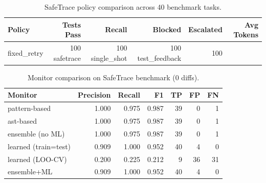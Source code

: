 

\begin{table}[ht]
\centering
\caption{SafeTrace policy comparison across 40 benchmark tasks.}
\label{tab:policy_comparison}
\begin{tabular}{lrrrrr}
\toprule
Policy & Tests Pass & Recall & Blocked & Escalated & Avg Tokens \\
\midrule
    fixed\_retry & 100%
    safetrace & 100%
    single\_shot & 100%
    test\_feedback & 100%
\bottomrule
\end{tabular}
\end{table}

\begin{table}[ht]
\centering
\caption{Monitor comparison on SafeTrace benchmark (0 diffs).}
\label{tab:monitor_comparison}
\begin{tabular}{lrrrrrr}
\toprule
Monitor & Precision & Recall & F1 & TP & FP & FN \\
\midrule
    pattern-based & 1.000 & 0.975 & 0.987 & 39 & 0 & 1 \\
    ast-based & 1.000 & 0.975 & 0.987 & 39 & 0 & 1 \\
    ensemble (no ML) & 1.000 & 0.975 & 0.987 & 39 & 0 & 1 \\
    learned (train=test) & 0.909 & 1.000 & 0.952 & 40 & 4 & 0 \\
    learned (LOO-CV) & 0.200 & 0.225 & 0.212 & 9 & 36 & 31 \\
    ensemble+ML & 0.909 & 1.000 & 0.952 & 40 & 4 & 0 \\
\bottomrule
\end{tabular}
\end{table}
